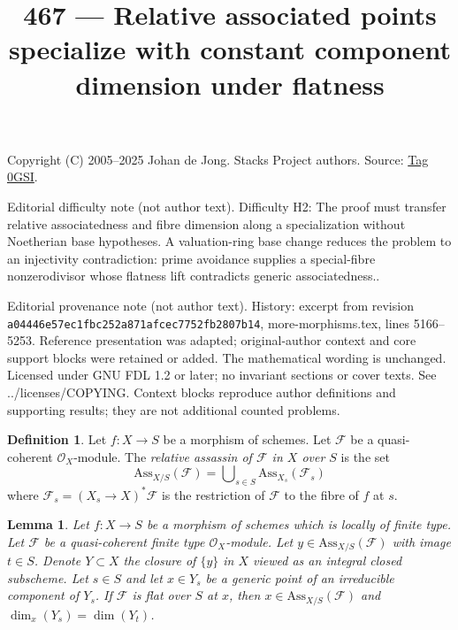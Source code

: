 \documentclass{amsart}
\theoremstyle{plain}
\newtheorem{lemma}[subsection]{Lemma}
\theoremstyle{definition}
\newtheorem{definition}[subsection]{Definition}
\theoremstyle{remark}
\numberwithin{equation}{subsection}
\begin{document}
\title[Stacks Project, Tag 0GSI]{467 --- Relative associated points specialize with constant component dimension under flatness}
\maketitle
\noindent Copyright (C) 2005--2025 Johan de Jong. Stacks Project authors. Source: \href{https://stacks.math.columbia.edu/tag/0GSI}{Tag 0GSI}.

\noindent Editorial difficulty note (not author text). Difficulty H2: The proof must transfer relative associatedness and fibre dimension along a specialization without Noetherian base hypotheses. A valuation-ring base change reduces the problem to an injectivity contradiction: prime avoidance supplies a special-fibre nonzerodivisor whose flatness lift contradicts generic associatedness..

\noindent Editorial provenance note (not author text). History: excerpt from revision \texttt{a0444\allowbreak 6e57e\allowbreak c1fbc\allowbreak 252a8\allowbreak 71afc\allowbreak ec775\allowbreak 2fb28\allowbreak 07b14}, more-morphisms.tex, lines 5166--5253. Reference presentation was adapted; original-author context and core support blocks were retained or added. The mathematical wording is unchanged. Licensed under GNU FDL 1.2 or later; no invariant sections or cover texts. See ../licenses/COPYING. Context blocks reproduce author definitions and supporting results; they are not additional counted problems.

\begin{definition}
\label{divisors-definition-relative-assassin}
Let $f : X \to S$ be a morphism of schemes.
Let $\mathcal{F}$ be a quasi-coherent $\mathcal{O}_X$-module.
The {\it relative assassin of $\mathcal{F}$ in $X$ over $S$}
is the set
$$
\text{Ass}_{X/S}(\mathcal{F}) =
\bigcup\nolimits_{s \in S} \text{Ass}_{X_s}(\mathcal{F}_s)
$$
where $\mathcal{F}_s = (X_s \to X)^*\mathcal{F}$ is the restriction
of $\mathcal{F}$ to the fibre of $f$ at $s$.
\end{definition}

\begin{lemma}
\label{lemma-associated-point-specializes}
Let $f : X \to S$ be a morphism of schemes which is locally of finite type.
Let $\mathcal{F}$ be a quasi-coherent finite type $\mathcal{O}_X$-module.
Let $y \in \text{Ass}_{X/S}(\mathcal{F})$ with image $t \in S$.
Denote $Y \subset X$ the closure of $\{y\}$ in $X$ viewed
as an integral closed subscheme. Let $s \in S$
and let $x \in Y_s$ be a generic point of an irreducible component
of $Y_s$. If $\mathcal{F}$ is flat over $S$ at $x$, then
$x \in \text{Ass}_{X/S}(\mathcal{F})$ and
$\dim_x(Y_s) = \dim(Y_t)$.
\end{lemma}
\end{document}
